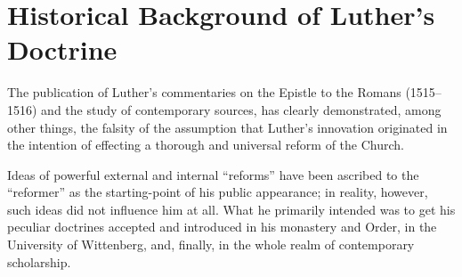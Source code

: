 \section{Historical Background of Luther’s Doctrine}

The publication of Luther’s commentaries on the Epistle to the
Romans (1515--1516) and the study of contemporary sources, has
clearly demonstrated, among other things, the falsity of the assumption
that Luther’s innovation originated in the intention of effecting
a thorough and universal reform of the Church.

Ideas of powerful external and internal “reforms” have been ascribed
to the “reformer” as the starting-point of his public appearance;
in reality, however, such ideas did not influence him at all.
What he primarily intended was to get his peculiar doctrines accepted
and introduced in his monastery and Order, in the University
of Wittenberg, and, finally, in the whole realm of contemporary
scholarship.

